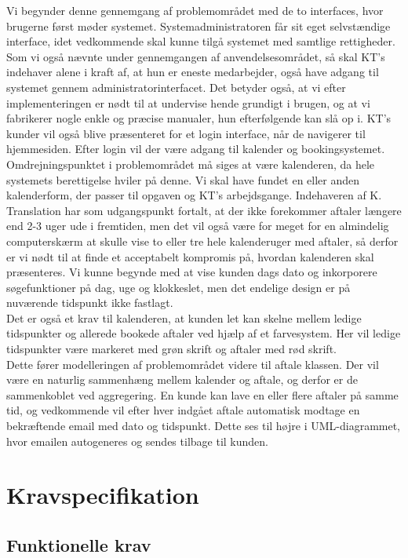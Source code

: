 \documentclass[12pt]{article}
\begin{document}
Vi begynder denne gennemgang af problemområdet med de to interfaces, hvor
brugerne først møder systemet. Systemadministratoren får sit eget selvstændige
interface, idet vedkommende skal kunne tilgå systemet med samtlige
rettigheder. Som vi også nævnte under gennemgangen af anvendelsesområdet, så
skal KT's indehaver alene i kraft af, at hun er eneste medarbejder, også have
adgang til systemet gennem administratorinterfacet. Det betyder også, at vi efter
implementeringen er nødt til at undervise hende grundigt i brugen, og at vi
fabrikerer nogle enkle og præcise manualer, hun efterfølgende kan slå op i.
KT's kunder vil også blive præsenteret for et login interface, når de
navigerer til hjemmesiden. Efter login vil der være adgang til kalender og
bookingsystemet. \\
Omdrejningspunktet i problemområdet må siges at være kalenderen, da hele
systemets berettigelse hviler på denne. Vi skal have fundet en eller anden
kalenderform, der passer til opgaven og KT's arbejdsgange. Indehaveren af K.
Translation har som udgangspunkt fortalt, at der ikke forekommer aftaler længere
end 2-3 uger ude i fremtiden, men det vil også være for meget for en
almindelig computerskærm at skulle vise to eller tre hele kalenderuger med
aftaler, så derfor er vi nødt til at finde et acceptabelt kompromis på,
hvordan kalenderen skal præsenteres. Vi kunne begynde med at vise kunden dags 
dato og inkorporere søgefunktioner på dag, uge og klokkeslet, men det endelige
design er på nuværende tidspunkt ikke fastlagt.\\
Det er også et krav til kalenderen, at kunden let kan skelne mellem ledige
tidspunkter og allerede bookede aftaler ved hjælp af et farvesystem. Her vil
ledige tidspunkter være markeret med grøn skrift og aftaler med rød skrift. \\
Dette fører modelleringen af problemområdet videre til aftale klassen. Der vil 
være en naturlig sammenhæng mellem kalender og aftale, og derfor er de
sammenkoblet ved aggregering. En kunde kan lave en eller flere aftaler på
samme tid, og vedkommende vil efter hver indgået aftale automatisk modtage en 
bekræftende email med dato og tidspunkt. Dette ses til højre i UML-diagrammet,
hvor emailen autogeneres og sendes tilbage til kunden. 

\section{Kravspecifikation}
\subsection{Funktionelle krav}
\end{document}
